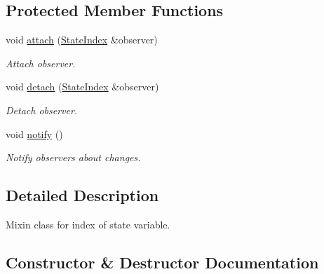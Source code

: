 \subsection*{Protected Member Functions}
\begin{DoxyCompactItemize}
\item 
\hypertarget{classSpacy_1_1Mixin_1_1MixinConnection_abb5520ee6b22dd993d78f142939a1ed4}{}void \hyperlink{classSpacy_1_1Mixin_1_1MixinConnection_abb5520ee6b22dd993d78f142939a1ed4}{attach} (\hyperlink{classSpacy_1_1Mixin_1_1StateIndex}{State\+Index} \&observer)\label{classSpacy_1_1Mixin_1_1MixinConnection_abb5520ee6b22dd993d78f142939a1ed4}

\begin{DoxyCompactList}\small\item\em Attach observer. \end{DoxyCompactList}\item 
\hypertarget{classSpacy_1_1Mixin_1_1MixinConnection_adda739590c487679c26f60e50aedb73f}{}void \hyperlink{classSpacy_1_1Mixin_1_1MixinConnection_adda739590c487679c26f60e50aedb73f}{detach} (\hyperlink{classSpacy_1_1Mixin_1_1StateIndex}{State\+Index} \&observer)\label{classSpacy_1_1Mixin_1_1MixinConnection_adda739590c487679c26f60e50aedb73f}

\begin{DoxyCompactList}\small\item\em Detach observer. \end{DoxyCompactList}\item 
\hypertarget{classSpacy_1_1Mixin_1_1MixinConnection_a1ddeaa78a3bb4a38c2cca36d1f99fe36}{}void \hyperlink{classSpacy_1_1Mixin_1_1MixinConnection_a1ddeaa78a3bb4a38c2cca36d1f99fe36}{notify} ()\label{classSpacy_1_1Mixin_1_1MixinConnection_a1ddeaa78a3bb4a38c2cca36d1f99fe36}

\begin{DoxyCompactList}\small\item\em Notify observers about changes. \end{DoxyCompactList}\end{DoxyCompactItemize}


\subsection{Detailed Description}
Mixin class for index of state variable. 

\subsection{Constructor \& Destructor Documentation}
\hypertarget{classSpacy_1_1Mixin_1_1StateIndex_a0dfcecf87c0982d6c4d8859661aad1fa_a0dfcecf87c0982d6c4d8859661aad1fa}{}
